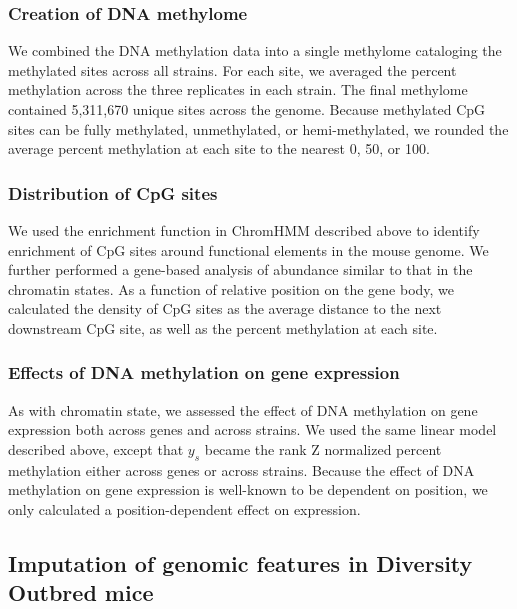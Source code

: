 \documentclass[10pt,letterpaper]{article}
\begin{document}
\hypertarget{creation-of-dna-methylome}{%
\subsubsection{Creation of DNA
methylome}\label{creation-of-dna-methylome}}

We combined the DNA methylation data into a single methylome cataloging
the methylated sites across all strains. For each site, we averaged the
percent methylation across the three replicates in each strain. The
final methylome contained 5,311,670 unique sites across the genome.
Because methylated CpG sites can be fully methylated, unmethylated, or
hemi-methylated, we rounded the average percent methylation at each site
to the nearest 0, 50, or 100.

\hypertarget{distribution-of-cpg-sites}{%
\subsubsection{Distribution of CpG
sites}\label{distribution-of-cpg-sites}}

We used the enrichment function in ChromHMM described above to identify
enrichment of CpG sites around functional elements in the mouse genome.
We further performed a gene-based analysis of abundance similar to that
in the chromatin states. As a function of relative position on the gene
body, we calculated the density of CpG sites as the average distance to
the next downstream CpG site, as well as the percent methylation at each
site.

\hypertarget{effects-of-dna-methylation-on-gene-expression}{%
\subsubsection{Effects of DNA methylation on gene
expression}\label{effects-of-dna-methylation-on-gene-expression}}

As with chromatin state, we assessed the effect of DNA methylation on
gene expression both across genes and across strains. We used the same
linear model described above, except that \(y_{s}\) became the rank Z
normalized percent methylation either across genes or across strains.
Because the effect of DNA methylation on gene expression is well-known
to be dependent on position, we only calculated a position-dependent
effect on expression.

\hypertarget{imputation-of-genomic-features-in-diversity-outbred-mice}{%
\subsection{Imputation of genomic features in Diversity Outbred
mice}\label{imputation-of-genomic-features-in-diversity-outbred-mice}}
\end{document}
